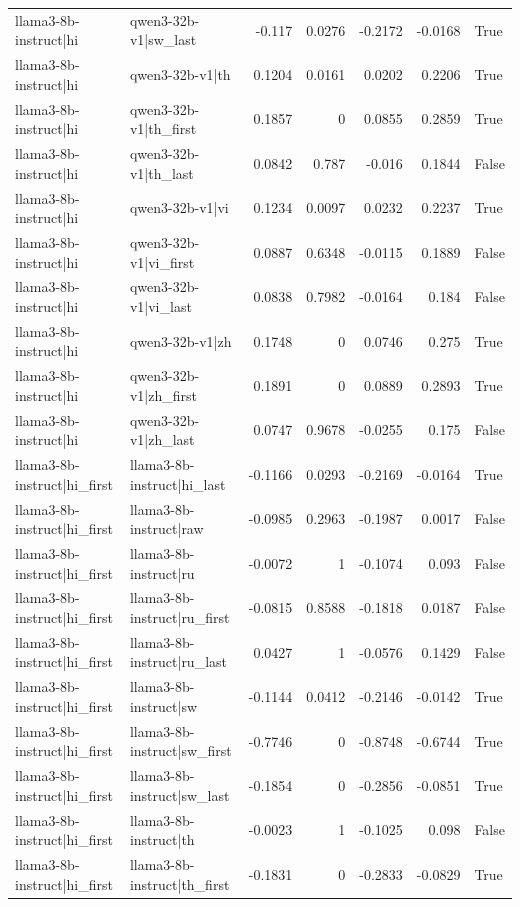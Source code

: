 \begin{table}
\begin{tabular}{l l r r r r l}
llama3-8b-instruct|hi & qwen3-32b-v1|sw_last & -0.117 & 0.0276 & -0.2172 & -0.0168 & True \\
llama3-8b-instruct|hi & qwen3-32b-v1|th & 0.1204 & 0.0161 & 0.0202 & 0.2206 & True \\
llama3-8b-instruct|hi & qwen3-32b-v1|th_first & 0.1857 & 0 & 0.0855 & 0.2859 & True \\
llama3-8b-instruct|hi & qwen3-32b-v1|th_last & 0.0842 & 0.787 & -0.016 & 0.1844 & False \\
llama3-8b-instruct|hi & qwen3-32b-v1|vi & 0.1234 & 0.0097 & 0.0232 & 0.2237 & True \\
llama3-8b-instruct|hi & qwen3-32b-v1|vi_first & 0.0887 & 0.6348 & -0.0115 & 0.1889 & False \\
llama3-8b-instruct|hi & qwen3-32b-v1|vi_last & 0.0838 & 0.7982 & -0.0164 & 0.184 & False \\
llama3-8b-instruct|hi & qwen3-32b-v1|zh & 0.1748 & 0 & 0.0746 & 0.275 & True \\
llama3-8b-instruct|hi & qwen3-32b-v1|zh_first & 0.1891 & 0 & 0.0889 & 0.2893 & True \\
llama3-8b-instruct|hi & qwen3-32b-v1|zh_last & 0.0747 & 0.9678 & -0.0255 & 0.175 & False \\
llama3-8b-instruct|hi_first & llama3-8b-instruct|hi_last & -0.1166 & 0.0293 & -0.2169 & -0.0164 & True \\
llama3-8b-instruct|hi_first & llama3-8b-instruct|raw & -0.0985 & 0.2963 & -0.1987 & 0.0017 & False \\
llama3-8b-instruct|hi_first & llama3-8b-instruct|ru & -0.0072 & 1 & -0.1074 & 0.093 & False \\
llama3-8b-instruct|hi_first & llama3-8b-instruct|ru_first & -0.0815 & 0.8588 & -0.1818 & 0.0187 & False \\
llama3-8b-instruct|hi_first & llama3-8b-instruct|ru_last & 0.0427 & 1 & -0.0576 & 0.1429 & False \\
llama3-8b-instruct|hi_first & llama3-8b-instruct|sw & -0.1144 & 0.0412 & -0.2146 & -0.0142 & True \\
llama3-8b-instruct|hi_first & llama3-8b-instruct|sw_first & -0.7746 & 0 & -0.8748 & -0.6744 & True \\
llama3-8b-instruct|hi_first & llama3-8b-instruct|sw_last & -0.1854 & 0 & -0.2856 & -0.0851 & True \\
llama3-8b-instruct|hi_first & llama3-8b-instruct|th & -0.0023 & 1 & -0.1025 & 0.098 & False \\
llama3-8b-instruct|hi_first & llama3-8b-instruct|th_first & -0.1831 & 0 & -0.2833 & -0.0829 & True \\

\end{tabular}
\end{table}
